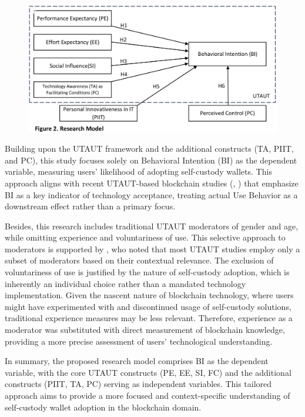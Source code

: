 \documentclass[twocolumn]{article}
\begin{document}
\begin{figure}[tp]
    \centering
    \includegraphics[width=0.9\linewidth]{Research Model.jpg}
    \label{fig:Model}
       
\end{figure}

Building upon the UTAUT framework and the additional constructs (TA, PIIT, and PC), this study focuses solely on Behavioral Intention (BI) as the dependent variable, measuring users' likelihood of adopting self-custody wallets. This approach aligns with recent UTAUT-based blockchain studies (\cite{chang_acceptance_2022}, \cite{queiroz_blockchain_2019}) that emphasize BI as a key indicator of technology acceptance, treating actual Use Behavior as a downstream effect rather than a primary focus.

Besides, this research includes traditional UTAUT moderators of gender and age, while omitting experience and voluntariness of use. This selective approach to moderators is supported by \textcite{dwivedi_re-examining_2019}, who noted that most UTAUT studies employ only a subset of moderators based on their contextual relevance. The exclusion of voluntariness of use is justified by the nature of self-custody adoption, which is inherently an individual choice rather than a mandated technology implementation. Given the nascent nature of blockchain technology, where users might have experimented with and discontinued usage of self-custody solutions, traditional experience measures may be less relevant. Therefore, experience as a moderator was substituted with direct measurement of blockchain knowledge, providing a more precise assessment of users' technological understanding.

In summary, the proposed research model comprises BI as the dependent variable, with the core UTAUT constructs (PE, EE, SI, FC) and the additional constructs (PIIT, TA, PC) serving as independent variables. This tailored approach aims to provide a more focused and context-specific understanding of self-custody wallet adoption in the blockchain domain.
\end{document}
